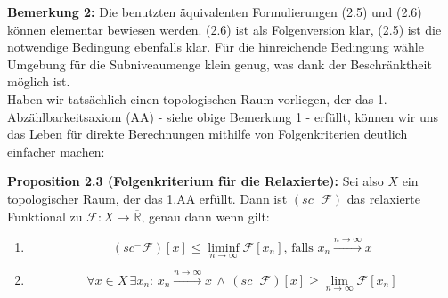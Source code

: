 \textbf{Bemerkung 2:} Die benutzten äquivalenten Formulierungen (2.5) und (2.6) können elementar bewiesen werden. (2.6) ist als Folgenversion klar, (2.5) ist die notwendige Bedingung ebenfalls klar. Für die hinreichende Bedingung wähle Umgebung für die Subniveaumenge klein genug, was dank der Beschränktheit möglich ist.\\

Haben wir tatsächlich einen topologischen Raum vorliegen, der das 1. Abzählbarkeitsaxiom (AA) - siehe obige Bemerkung 1 - erfüllt, können wir uns das Leben für direkte Berechnungen mithilfe von Folgenkriterien deutlich einfacher machen:\\
\colorbox{lemyellow}{\begin{minipage}{16cm}{\textcolor{black}{}{\label{prop2.3}}}
\textbf{Proposition 2.3 (Folgenkriterium für die Relaxierte):} Sei also \(X\) ein topologischer Raum, der das 1.AA erfüllt. Dann ist \((sc^-\mathcal{F})\) das relaxierte Funktional zu \(\mathcal{F}:X \to \overline{\mathbb{R}}\), genau dann wenn gilt:
\begin{enumerate}
    \item \begin{equation}
        (sc^- \mathcal{F})[x] \le \liminf_{n \to \infty} \mathcal{F}[x_n], \, \text{falls }x_n \stackrel{n \to \infty}{\to} x
    \end{equation}
    \item \begin{equation}
        \forall x \in X \,\exists x_n:\, x_n \stackrel{n \to \infty}{\to} x\, \land \, (sc^- \mathcal{F})[x] \geq \lim_{n \to \infty} \mathcal{F}[x_n]
    \end{equation}
\end{enumerate}
\end{minipage}}

